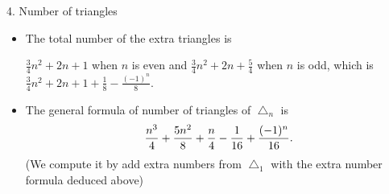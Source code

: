 \documentclass{beamer}
\begin{document}
\begin{frame}{4. Number of triangles}
\begin{itemize}
\begin{itemize}
\begin{minipage}{0.7\linewidth}
                  \begin{itemize}
                    \item $n=2k$ is even\\
                          We can see that each extra down triangle must satisfy that  its lowest vertex $A$ lie on the
                          line $l$.
                          With different $A$, we have $2(1+2+\cdots+k)=k(k+1)=\frac{n^2}{4}+\frac{n}{2}$ extra triangles.
                    \item $n=2k+1$ is odd\\
                          Move $A$ from left to center point (showing as the dashed line and the right side is symmetric
                          with left), we have $2(1+2+\cdots+k)+(k+1)=(k+1)^2=(\frac{n+1}{4})^2$ extra triangles.
                  \end{itemize}
                \end{minipage}%
                   \begin{minipage}{0.2\linewidth}\hspace*{2em}
                \end{minipage}
             \framebreak     
\item The total number of the extra triangles  is
                  
                  $\frac{3}{4}n^2+2n+1$ when $n$ is even and  $\frac{3}{4}n^2+2n+\frac{5}{4}$ when $n$ is odd, which is
                  $ \frac{3}{4}n^2+2n+1+\frac{1}{8}-\frac{(-1)^n }{8}$.
            \item The general formula of number of triangles of $\bigtriangleup_n$ is
                  \begin{align*}
                    \frac{n^3}{4}+{5n^2\over 8}+{n\over 4} -{1\over 16}+ {(-1)^{n}\over 16}.
                  \end{align*}
                  (We compute it by add extra numbers from $\bigtriangleup_1$ with the extra number formula deduced above) 


\end{itemize}
\end{itemize}
\end{frame}
\end{document}
